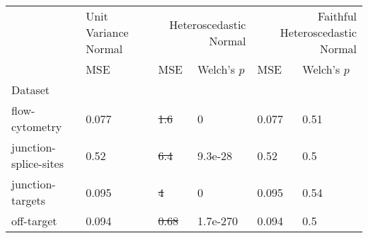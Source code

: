 \begin{tabular}{l|l|ll|ll}
\toprule
 & Unit Variance Normal & \multicolumn{2}{r}{Heteroscedastic Normal} & \multicolumn{2}{r}{Faithful Heteroscedastic Normal} \\
 & MSE & MSE & Welch's $p$ & MSE & Welch's $p$ \\
Dataset &  &  &  &  &  \\
\midrule
flow-cytometry & 0.077 & \sout{1.6} & 0 & 0.077 & 0.51 \\
junction-splice-sites & 0.52 & \sout{6.4} & 9.3e-28 & 0.52 & 0.5 \\
junction-targets & 0.095 & \sout{4} & 0 & 0.095 & 0.54 \\
off-target & 0.094 & \sout{0.68} & 1.7e-270 & 0.094 & 0.5 \\
\bottomrule
\end{tabular}
